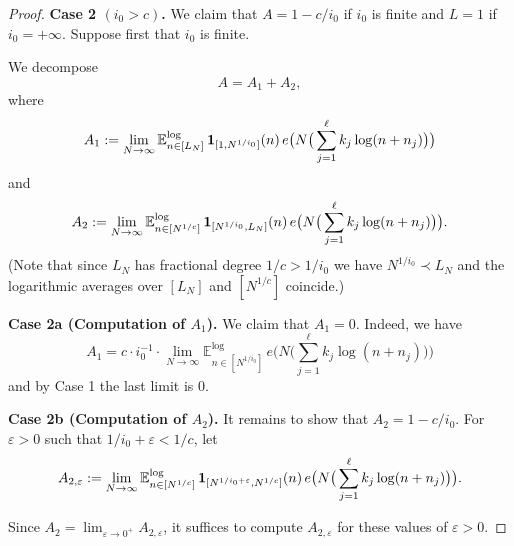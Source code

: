 \documentclass[11pt]{amsart}
\theoremstyle{definition}
\newcommand{\lE}{\mathbb{E}^{\log}}
\begin{document}
\begin{proof}
	\medskip
	
	
	{\bf Case 2 $(i_0>c)$.}  	  We claim that  $A=1-c/i_0$ if $i_0$ is finite
	and $L=1$ if $i_0=+\infty$.  Suppose first that $i_0$ is finite.
	
	
	We  decompose
	$$
	A=A_1+A_2,
	$$
	where
	$$
	A_1:=	\lim_{N\to\infty} \lE_{n\in[L_N]}\, {\bf 1}_{[1,N^{1/i_0}]} (n)\,  e\big(N\big(\sum_{j=1}^\ell k_j \log(n+n_j)\big)\big)
	$$	
	and
	$$
	A_2:=\lim_{N\to\infty}	\lE_{n\in[N^{1/c}]}\, {\bf 1}_{[N^{1/i_0},L_N]} (n)\,  e\big(N\big(\sum_{j=1}^\ell k_j \log(n+n_j)\big)\big).
	$$			
(Note that since $L_N$ has fractional degree $1/c>1/i_0$ we have $N^{1/i_0}\prec L_N$ and the logarithmic averages over $[L_N]$ and $[N^{1/c}]$ coincide.)
	
	\medskip
	
	{\bf Case 2a (Computation of $A_1$).}  	We claim that  $A_1=0$.  Indeed, we have
	$$
	A_1=c\cdot i_0^{-1}\cdot 	\lim_{N\to\infty} \lE_{n\in[N^{1/i_0}]}\,   e\big(N\big(\sum_{j=1}^\ell k_j \log(n+n_j)\big)\big)
	$$	
	and
	by Case 1 the last limit is $0$.
	
	\medskip
	
	{\bf Case 2b (Computation of $A_2$).}
	It remains to show that  $A_2=1-c/i_0$.
	For $\varepsilon>0$ such that $1/i_0+\varepsilon<1/c$, let
	\begin{equation}\label{E:A2e}
	A_{2,\varepsilon}:=\lim_{N\to\infty}	\lE_{n\in[N^{1/c}]}\, {\bf 1}_{[N^{1/i_0+\varepsilon},N^{1/c}]} (n)\,  e\big(N\big(\sum_{j=1}^\ell k_j \log(n+n_j)\big)\big).
	\end{equation}
	
	Since $A_2=\lim_{\varepsilon\to 0^+}A_{2,\varepsilon}$, it suffices to compute $A_{2,\varepsilon}$ for these  values of $\varepsilon>0$.
	

\end{proof}
\end{document}
